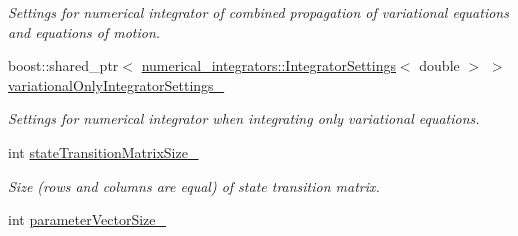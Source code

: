 \begin{DoxyCompactItemize}
\begin{DoxyCompactList}\small\item\em Settings for numerical integrator of combined propagation of variational equations and equations of motion. \end{DoxyCompactList}\item 
boost\+::shared\+\_\+ptr$<$ \hyperlink{classtudat_1_1numerical__integrators_1_1IntegratorSettings}{numerical\+\_\+integrators\+::\+Integrator\+Settings}$<$ double $>$ $>$ \hyperlink{classtudat_1_1propagators_1_1VariationalEquationsSolver_aab806e22e2846e9a3fe728415d4bc3e0}{variational\+Only\+Integrator\+Settings\+\_\+}\hypertarget{classtudat_1_1propagators_1_1VariationalEquationsSolver_aab806e22e2846e9a3fe728415d4bc3e0}{}\label{classtudat_1_1propagators_1_1VariationalEquationsSolver_aab806e22e2846e9a3fe728415d4bc3e0}

\begin{DoxyCompactList}\small\item\em Settings for numerical integrator when integrating only variational equations. \end{DoxyCompactList}\item 
int \hyperlink{classtudat_1_1propagators_1_1VariationalEquationsSolver_a95ad604b916f45a66a30f39b9fd3ccfe}{state\+Transition\+Matrix\+Size\+\_\+}\hypertarget{classtudat_1_1propagators_1_1VariationalEquationsSolver_a95ad604b916f45a66a30f39b9fd3ccfe}{}\label{classtudat_1_1propagators_1_1VariationalEquationsSolver_a95ad604b916f45a66a30f39b9fd3ccfe}

\begin{DoxyCompactList}\small\item\em Size (rows and columns are equal) of state transition matrix. \end{DoxyCompactList}\item 
int \hyperlink{classtudat_1_1propagators_1_1VariationalEquationsSolver_a9588a7ecfb76f72d9a0446701c0ae9cd}{parameter\+Vector\+Size\+\_\+}\hypertarget{classtudat_1_1propagators_1_1VariationalEquationsSolver_a9588a7ecfb76f72d9a0446701c0ae9cd}{}\label{classtudat_1_1propagators_1_1VariationalEquationsSolver_a9588a7ecfb76f72d9a0446701c0ae9cd}


\end{DoxyCompactItemize}
